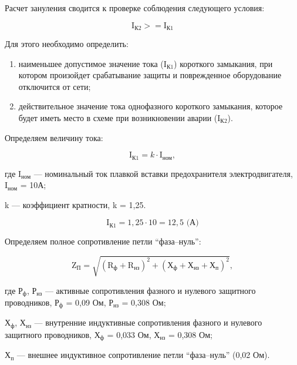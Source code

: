 Расчет зануления сводится к проверке соблюдения следующего условия:

\begin{equation}
  \text{I}_{\text{К2}} >= \text{I}_{\text{К1}}
\end{equation}

Для этого необходимо определить:

\begin{enumerate}
	\item наименьшее допустимое значение тока (\(\text{I}_{\text{К1}}\)) короткого замыкания, при котором произойдет срабатывание защиты и поврежденное оборудование отключится от сети;
	\item действительное значение тока однофазного короткого замыкания, которое будет иметь место в схеме при возникновении аварии (\(\text{I}_{\text{К2}}\)).
\end{enumerate}

Определяем величину тока:

\begin{equation}
  \text{I}_{\text{К1}} = k\cdot\text{I}_\text{ном},
\end{equation}

где \(\text{I}_\text{ном}\) --- номинальный ток плавкой вставки предохранителя электродвигателя, \(\text{I}_\text{ном}\) = 10А;

k --- коэффициент кратности, k = 1,25.

\begin{equation}
  \text{I}_{\text{К1}} = 1,25\cdot10 = 12,5\text{ (А)}
\end{equation}

Определяем полное сопротивление петли “фаза–нуль”:

\begin{equation}
  \text{Z}_\text{П} = \sqrt{(\text{R}_\text{ф}+\text{R}_\text{нз})^2+(\text{Х}_\text{ф}+\text{Х}_\text{нз}+\text{Х}_\text{п})^2},
\end{equation}

где \(\text{Р}_\text{ф}\), \(\text{Р}_\text{нз}\) --- активные сопротивления фазного и нулевого защитного проводников, \(\text{Р}_\text{ф}\) = 0,09 Ом, \(\text{Р}_\text{нз}\) = 0,308 Ом;

\(\text{Х}_\text{ф}\), \(\text{Х}_\text{нз}\) --- внутренние индуктивные сопротивления фазного и нулевого защитного проводников, \(\text{Х}_\text{ф}\) = 0,033 Ом, \(\text{Х}_\text{нз}\) = 0,308 Ом;

\(\text{Х}_\text{п}\) --- внешнее индуктивное сопротивление петли “фаза–нуль” (0,02 Ом).

